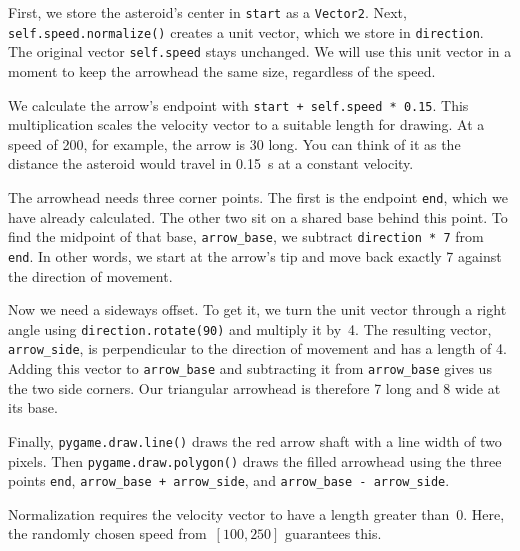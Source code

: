 First, we store the asteroid's center in \texttt{start} as a \texttt{Vector2}. Next, \texttt{self.speed.normalize()} creates a unit vector, which we store in \texttt{direction}. The original vector \texttt{self.speed} stays unchanged. We will use this unit vector in a moment to keep the arrowhead the same size, regardless of the speed.

We calculate the arrow's endpoint with \texttt{start + self.speed * 0.15}. This multiplication scales the velocity vector to a suitable length for drawing. At a speed of \SI{200}{\pxsec}, for example, the arrow is \SI{30}{\pixel} long. You can think of it as the distance the asteroid would travel in \SI{0.15}{\second} at a constant velocity.

The arrowhead needs three corner points. The first is the endpoint \texttt{end}, which we have already calculated. The other two sit on a shared base behind this point. To find the midpoint of that base, \texttt{arrow\_base}, we subtract \texttt{direction * 7} from \texttt{end}. In other words, we start at the arrow's tip and move back exactly \SI{7}{\pixel} against the direction of movement.

\begin{figure}%
	\begin{center}%
		\vspace{-2em}%
	\end{center}%
\end{figure}%
Now we need a sideways offset. To get it, we turn the unit vector through a right angle using \texttt{direction.rotate(90)} and multiply it by~4. The resulting vector, \texttt{arrow\_side}, is perpendicular to the direction of movement and has a length of \SI{4}{\pixel}. Adding this vector to \texttt{arrow\_base} and subtracting it from \texttt{arrow\_base} gives us the two side corners. Our triangular arrowhead is therefore \SI{7}{\pixel} long and \SI{8}{\pixel} wide at its base.

Finally, \texttt{pygame.draw.line()} draws the red arrow shaft with a line width of two pixels. Then \texttt{pygame.draw.polygon()} draws the filled arrowhead using the three points \texttt{end}, \texttt{arrow\_base + arrow\_side}, and \texttt{arrow\_base - arrow\_side}.

Normalization requires the velocity vector to have a length greater than~0. Here, the randomly chosen speed from~$[100,250]$ guarantees this.


